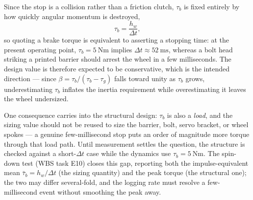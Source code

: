 Since the stop is a collision rather than a friction clutch, $\tau_b$ is fixed
entirely by how quickly angular momentum is destroyed,
\begin{equation}
\tau_b = \frac{h_w}{\Delta t},
\label{eq:tau_b_from_dt}
\end{equation}
so quoting a brake torque is equivalent to asserting a stopping time: at the
present operating point, $\tau_b=\qty{5}{\newton\metre}$ implies $\Delta t
\approx \qty{52}{\milli\second}$, whereas a bolt head striking a printed
barrier should arrest the wheel in a few milliseconds. The design value is
therefore expected to be conservative, which is the intended direction ---
since $\beta=\tau_b/(\tau_b-\tau_g)$ falls toward unity as $\tau_b$ grows,
underestimating $\tau_b$ inflates the inertia requirement while overestimating
it leaves the wheel undersized.

One consequence carries into the structural design: $\tau_b$ is also a
\emph{load}, and the sizing value should not be reused to size the barrier,
bolt, servo bracket, or wheel spokes --- a genuine few-millisecond stop puts an
order of magnitude more torque through that load path. Until measurement
settles the question, the structure is checked against a short-$\Delta t$ case
while the dynamics use $\tau_b=\qty{5}{\newton\metre}$. The spin-down test
(WBS task E10) closes this gap, reporting both the
impulse-equivalent mean $\bar\tau_b=h_w/\Delta t$ (the sizing quantity) and the
peak torque (the structural one); the two may differ several-fold, and the
logging rate must resolve a few-millisecond event without smoothing the peak
away.

